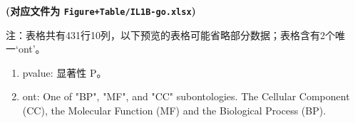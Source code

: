 \documentclass[
]{article}
\providecommand{\tightlist}{%
  \setlength{\itemsep}{0pt}\setlength{\parskip}{0pt}}
\begin{document}
\textbf{(对应文件为 \texttt{Figure+Table/IL1B-go.xlsx})}

\begin{center}\begin{tcolorbox}[colback=gray!10, colframe=gray!50, width=0.9\linewidth, arc=1mm, boxrule=0.5pt]注：表格共有431行10列，以下预览的表格可能省略部分数据；表格含有2个唯一`ont'。
\end{tcolorbox}
\end{center}
\begin{center}\begin{tcolorbox}[colback=gray!10, colframe=gray!50, width=0.9\linewidth, arc=1mm, boxrule=0.5pt]\begin{enumerate}\tightlist
\item pvalue:  显著性 P。
\item ont:  One of "BP", "MF", and "CC" subontologies. The Cellular Component (CC), the Molecular Function (MF) and the Biological Process (BP).
\end{enumerate}\end{tcolorbox}
\end{center}
\end{document}
